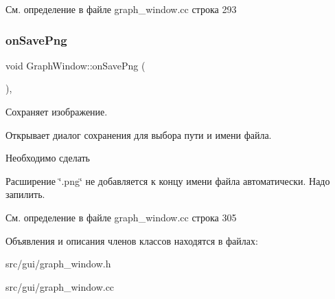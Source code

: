 См. определение в файле graph\+\_\+window.\+cc строка 293

\hypertarget{class_graph_window_a51f89adcbef5b90b9fdbb24bf7536fe5}{}\label{class_graph_window_a51f89adcbef5b90b9fdbb24bf7536fe5} 
\subsubsection{\texorpdfstring{on\+Save\+Png}{onSavePng}}
{\footnotesize\ttfamily void Graph\+Window\+::on\+Save\+Png (\begin{DoxyParamCaption}{ }\end{DoxyParamCaption})\hspace{0.3cm}{\ttfamily [private]}, {\ttfamily [slot]}}



Сохраняет изображение. 

Открывает диалог сохранения для выбора пути и имени файла.

\begin{DoxyRefDesc}{Необходимо сделать}
\item[\hyperlink{todo__todo000001}{Необходимо сделать}]Расширение \char`\"{}.\+png\char`\"{} не добавляется к концу имени файла автоматически. Надо запилить. \end{DoxyRefDesc}


См. определение в файле graph\+\_\+window.\+cc строка 305



Объявления и описания членов классов находятся в файлах\+:\begin{DoxyCompactItemize}
\item 
src/gui/graph\+\_\+window.\+h\item 
src/gui/graph\+\_\+window.\+cc\end{DoxyCompactItemize}
